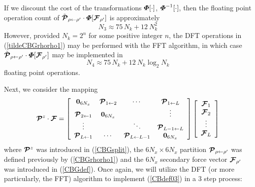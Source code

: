 If we discount the cost of the transformations ${\mbox{\boldmath$\mit \Phi$\unboldmath}}[\cdot]$, 
${\mbox{\boldmath$\mit \Phi$\unboldmath}}^{-1}[\cdot]$, then the floating point operation count of 
$\tilde{\mbox{\boldmath$\cal P$\unboldmath}}_{ \rho \leftarrow {\rho }^{\prime}}
\cdot{\mbox{\boldmath$\mit \Phi$\unboldmath}}[{\mbox{\boldmath$\cal F$\unboldmath}}_{{\rho 
}^{\prime}}]$ is 
approximately
\[
N_3\approx 75\,{N}_{k}+12\ {N}_{k}^{2}
\]
However, provided $N_k= 2^n$ for some positive integer $n$,
the DFT operations in (\ref{tildeCBGrhorho1}) may be performed with the 
FFT algorithm, in which case $\tilde{\mbox{\boldmath$\cal P$\unboldmath}}_{ \rho \leftarrow {\rho }^{\prime}}
\cdot{\mbox{\boldmath$\mit \Phi$\unboldmath}}[{\mbox{\boldmath$\cal F$\unboldmath}}_{{\rho 
}^{\prime}}]$ may be implemented in
\[
N_4 \approx 75\,{N}_{k}+12\ {N}_{k} \log_2 N_k
\]
floating point operations.


Next, we consider the mapping
\begin{equation} \label{CBdef03}
{\mbox{\boldmath$\cal P$\unboldmath}}{}^{z}\cdot {\mbox{\boldmath$\cal F$\unboldmath}}=\left[{\begin{array}{cccc}
{\bf 0}_{6N_x}&{\mbox{\boldmath$\cal P$\unboldmath}}_{1 
\leftarrow   2}&\cdots &{\mbox{\boldmath$\cal P$\unboldmath}}_{1 \leftarrow   L}\\ {\mbox{\boldmath$\cal P$\unboldmath}}_{2 
\leftarrow   1}&{\bf 0}_{6N_x}&&\vdots\\ 
\vdots&&\ddots&{\mbox{\boldmath$\cal P$\unboldmath}}_{L-1 \leftarrow   L}\\ {\mbox{\boldmath$\cal P$\unboldmath}}_{L \leftarrow   
1}&\cdots &{\mbox{\boldmath$\cal P$\unboldmath}}_{L \leftarrow   L-1}&{\bf 0}_{6N_x}\end{array}}\right] 
\left[\begin{array}{c}
{\mbox{\boldmath$\cal F$\unboldmath}}_{1}\\ {\mbox{\boldmath$\cal F$\unboldmath}}_{2}\\
\vdots\\
{\mbox{\boldmath$\cal F$\unboldmath}}_{L}  \end{array}  \right]
\end{equation}
where ${\mbox{\boldmath$\cal P$\unboldmath}}{}^{z}$ was introduced in (\ref{CBGsplit}),  the $6 N_x \times 6 N_x$ partition ${\mbox{\boldmath$\cal P$\unboldmath}}_{\rho 
\leftarrow   \rho^{\prime}}$ was defined previously by (\ref{CBGrhorho1})
and the $6 N_x$ secondary force vector ${\mbox{\boldmath$\cal F$\unboldmath}}_{\rho^{\prime}}$
was introduced in  (\ref{CBGdef}). Once again, we will utilize the DFT (or 
more particularly, the FFT) algorithm to implement (\ref{CBdef03}) in a 
$3$ step process:
